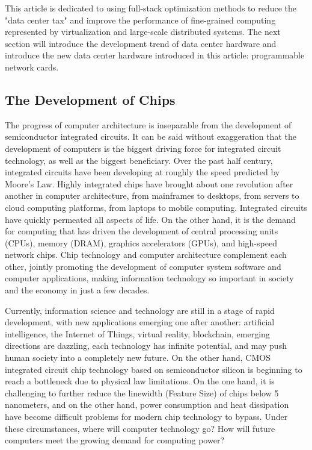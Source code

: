 This article is dedicated to using full-stack optimization methods to reduce the "data center tax" and improve the performance of fine-grained computing represented by virtualization and large-scale distributed systems. The next section will introduce the development trend of data center hardware and introduce the new data center hardware introduced in this article: programmable network cards.

\iffalse

\subsection{The Development of Chips}

The progress of computer architecture is inseparable from the development of semiconductor integrated circuits. It can be said without exaggeration that the development of computers is the biggest driving force for integrated circuit technology, as well as the biggest beneficiary. Over the past half century, integrated circuits have been developing at roughly the speed predicted by Moore's Law. Highly integrated chips have brought about one revolution after another in computer architecture, from mainframes to desktops, from servers to cloud computing platforms, from laptops to mobile computing. Integrated circuits have quickly permeated all aspects of life. On the other hand, it is the demand for computing that has driven the development of central processing units (CPUs), memory (DRAM), graphics accelerators (GPUs), and high-speed network chips. Chip technology and computer architecture complement each other, jointly promoting the development of computer system software and computer applications, making information technology so important in society and the economy in just a few decades.

Currently, information science and technology are still in a stage of rapid development, with new applications emerging one after another: artificial intelligence, the Internet of Things, virtual reality, blockchain, emerging directions are dazzling, each technology has infinite potential, and may push human society into a completely new future. On the other hand, CMOS integrated circuit chip technology based on semiconductor silicon is beginning to reach a bottleneck due to physical law limitations. On the one hand, it is challenging to further reduce the linewidth (Feature Size) of chips below 5 nanometers, and on the other hand, power consumption and heat dissipation have become difficult problems for modern chip technology to bypass. Under these circumstances, where will computer technology go? How will future computers meet the growing demand for computing power?

